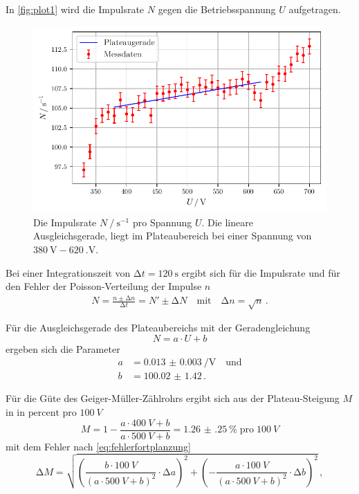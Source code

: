 In \autoref{fig:plot1} wird die Impulsrate $N$ gegen die Betriebsspannung $U$ aufgetragen.
\begin{figure}[H]
    \centering
    \includegraphics[width = 0.9\linewidth]{build/plot1.pdf}
    \caption{Die Impulsrate $N \mathbin{/} \mathrm{s^{-1}}$ pro Spannung $U$.
    Die lineare Ausgleichsgerade, liegt im Plateaubereich bei einer Spannung
    von $\qty{380}{\volt} - \qty{620}{.\volt}$.}
    \label{fig:plot1}
\end{figure}

Bei einer Integrationszeit von $\increment t = \qty{120}{\second}$ ergibt sich für die Impulsrate
und für den Fehler der Poisson-Verteilung der Impulse $n$
\begin{align} \label{eq:impulsrate}
    N = \frac{n \pm \increment n}{\increment t} = N' \pm \increment N
    \quad \text{mit} \quad
    \increment n = \sqrt{n} \, .
\end{align}



Für die Ausgleichsgerade des Plateaubereichs mit der Geradengleichung
\begin{equation*}
    N = a \cdot U + b 
\end{equation*}
ergeben sich die Parameter
\begin{align*}
    a &= \qty{0.013(3)}{\per\volt} \quad \text{und} \\
    b &= \num{100.02(142)} \, .
\end{align*}

Für die Güte des Geiger-Müller-Zählrohrs ergibt sich aus der Plateau-Steigung $M$ in in
$\mathrm{percent}$ pro $\qty{100}{V}$
\begin{equation*}
    M = 1 - \frac{a \cdot \qty{400}{V} +b}{a \cdot \qty{500}{V} +b} 
    = \qty{1.26(25)}{\percent} \; \text{pro} \; \qty{100}{V} 
\end{equation*}
mit dem Fehler nach \autoref{eq:fehlerfortplanzung}
\begin{equation*}
    \increment M 
    = \sqrt{
        \left(\frac{b \cdot \qty{100}{V}}{\left( a \cdot \qty{500}{V} +b \right)^{2}} \cdot \increment a\right)^{2} +
        \left(-\frac{a \cdot \qty{100}{V}}{\left( a \cdot \qty{500}{V} +b \right)^{2}} \cdot \increment b\right)^{2}
    } \, ,
\end{equation*}

